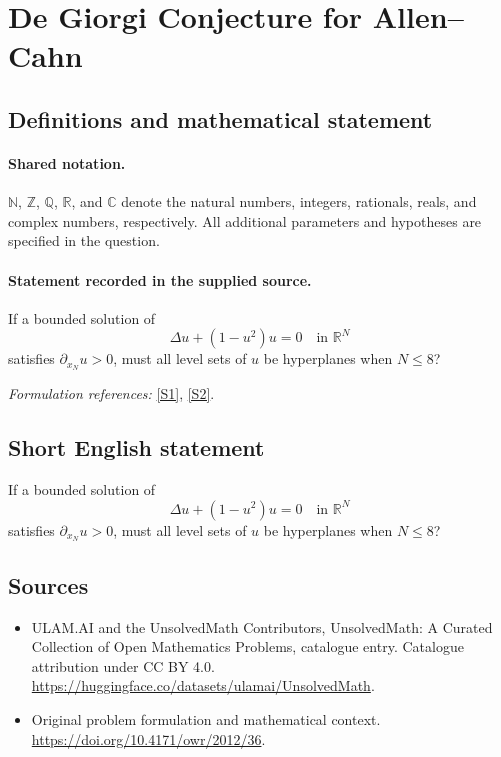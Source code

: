 \documentclass[11pt]{article}
\newcommand{\sref}[2]{\hyperlink{source:#1:#2}{[S#2]}}
\begin{document}
\section{De Giorgi Conjecture for Allen–Cahn}\label{statement}

\subsection{Definitions and mathematical statement}

\paragraph{Shared notation.}$\mathbb N$, $\mathbb Z$, $\mathbb Q$, $\mathbb R$, and $\mathbb C$ denote the natural numbers, integers, rationals, reals, and complex numbers, respectively. All additional parameters and hypotheses are specified in the question.


\paragraph{Statement recorded in the supplied source.}
If a bounded solution of
$$\Delta u+(1-u^2)u=0\quad\text{in }\mathbb R^N$$
satisfies $\partial_{x_N}u>0$, must all level sets of $u$ be hyperplanes when $N\leq8$?
\par\smallskip\textit{Formulation references:} \sref{statement}{1}, \sref{statement}{2}.
\subsection{Short English statement}
If a bounded solution of
$$\Delta u+(1-u^2)u=0\quad\text{in }\mathbb R^N$$
satisfies $\partial_{x_N}u>0$, must all level sets of $u$ be hyperplanes when $N\leq8$?
\subsection{Sources}
\begin{itemize}
\item[\hypertarget{source:statement:1}{S1}] ULAM.AI and the UnsolvedMath Contributors, UnsolvedMath: A Curated Collection of Open Mathematics Problems, catalogue entry. Catalogue attribution under CC BY 4.0.
\url{https://huggingface.co/datasets/ulamai/UnsolvedMath}.
\item[\hypertarget{source:statement:2}{S2}] Original problem formulation and mathematical context.
\url{https://doi.org/10.4171/owr/2012/36}.
\end{itemize}
\label{end:statement}
\end{document}
